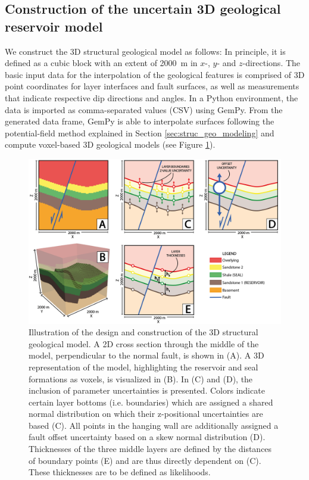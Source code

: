 		\subsection{Construction of the uncertain 3D geological reservoir model}\label{sec:3D_construction}
		We construct the 3D structural geological model as follows: In principle, it is defined as a cubic block with an extent of 2000~m in $x$-, $y$- and $z$-directions. The basic input data for the interpolation of the geological features is comprised of 3D point coordinates for layer interfaces and fault surfaces, as well as measurements that indicate respective dip directions and angles. In a Python environment, the data is imported as comma-separated values (CSV) using GemPy. From the generated data frame, GemPy is able to interpolate surfaces following the potential-field method explained in Section \ref{sec:struc_geo_modeling} and compute voxel-based 3D geological models (see Figure \ref{fig:3Dmodel_construction}).
		\begin{figure}[h]
			\centering
			\includegraphics[width=1\textwidth]{Figures/Uncertainties_Likelihoods.png}
			\caption{Illustration of the design and construction of the 3D structural geological model. A 2D cross section through the middle of the model, perpendicular to the normal fault, is shown in (A). A 3D representation of the model, highlighting the reservoir and seal formations as voxels, is visualized in (B). In (C) and (D), the inclusion of parameter uncertainties is presented. Colors indicate certain layer bottoms (i.e. boundaries) which are assigned a shared normal distribution on which their z-positional uncertainties are based (C). All points in the hanging wall are additionally assigned a fault offset uncertainty based on a skew normal distribution (D). Thicknesses of the three middle layers are defined by the distances of boundary points (E) and are thus directly dependent on (C). These thicknesses are to be defined as likelihoods.}\label{fig:3Dmodel_construction}
		\end{figure}\\
